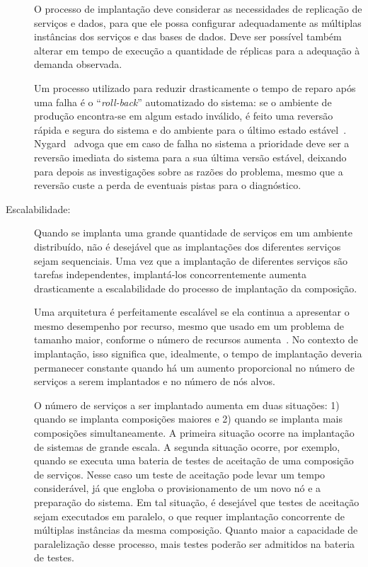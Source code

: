 \begin{description}
O processo de implantação deve considerar as necessidades de replicação de serviços e dados,
para que ele possa configurar adequadamente as múltiplas instâncias dos serviços e das bases de dados.
Deve ser possível também alterar em tempo de execução a quantidade de réplicas para
a adequação à demanda observada.

Um processo utilizado para reduzir drasticamente o tempo de reparo após uma falha
é o ``\emph{roll-back}'' automatizado do sistema: se o ambiente de produção encontra-se em algum estado inválido, 
é feito uma reversão rápida e segura do sistema e do ambiente para 
o último estado estável~\cite{Hamilton2007InternetScale, Brewer2001GiantScale}. 
Nygard~\cite{Nygard2009Release} advoga que em caso de falha no sistema a prioridade deve ser 
a reversão imediata do sistema para a sua última versão estável, 
deixando para depois as investigações sobre as razões do problema, 
mesmo que a reversão custe a perda de eventuais pistas para o diagnóstico. 

\item [Escalabilidade:]

Quando se implanta uma grande quantidade de serviços em um ambiente distribuído,
não é desejável que as implantações dos diferentes serviços sejam sequenciais.
Uma vez que a implantação de diferentes serviços são tarefas independentes,
implantá-los concorrentemente aumenta drasticamente a escalabilidade
do processo de implantação da composição.

Uma arquitetura é perfeitamente escalável
se ela continua a apresentar o mesmo desempenho por recurso,
mesmo que usado em um problema de tamanho maior, conforme o número
de recursos aumenta~\cite{Quinn1994Scalability}.
No contexto de implantação, isso significa que, idealmente,
o tempo de implantação deveria permanecer constante quando há um
aumento proporcional no número de serviços a serem implantados e
no número de nós alvos.

O número de serviços a ser implantado aumenta em duas situações:
1) quando se implanta composições maiores e 2) quando se implanta
mais composições simultaneamente. 
A primeira situação ocorre na implantação de sistemas de grande escala.
A segunda situação ocorre, por exemplo,
quando se executa uma bateria de testes de aceitação de uma composição de serviços.
Nesse caso um teste de aceitação pode levar um tempo considerável,
já que engloba o provisionamento de um novo nó e a preparação do sistema.
Em tal situação, é desejável que testes de aceitação sejam executados em paralelo,
o que requer implantação concorrente de múltiplas instâncias da mesma composição.
Quanto maior a capacidade de paralelização desse processo,
mais testes poderão ser admitidos na bateria de testes.


\end{description}
